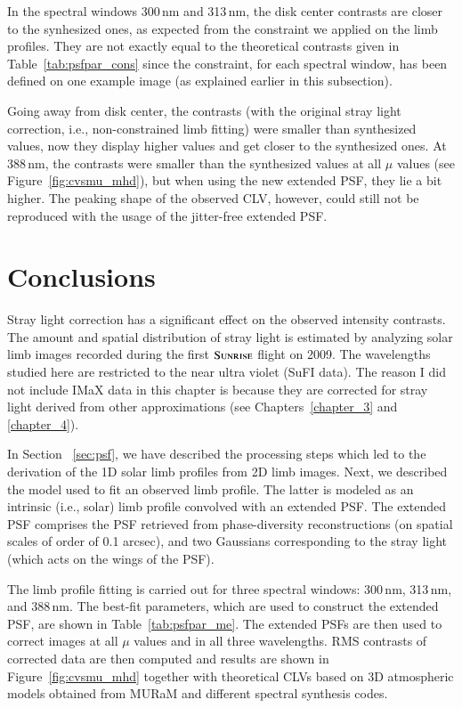\documentclass[goettingen, gauss, print]{thesis}
\begin{document}
In the spectral windows 300\,nm and 313\,nm, the disk center contrasts are closer to the synhesized ones, as expected from the constraint we applied on the limb profiles. They are not exactly equal to the theoretical contrasts given in Table~\ref{tab:psfpar_cons} since the constraint, for each spectral window, has been defined on one example image (as explained earlier in this subsection). 

Going away from disk center, the contrasts (with the original stray light correction, i.e., non-constrained limb fitting) were smaller than synthesized values, now they display higher values and get closer to the synthesized ones. At 388\,nm, the contrasts were smaller than the synthesized values at all $\mu$ values (see Figure~\ref{fig:cvsmu_mhd}), but when using the new extended PSF, they lie a bit higher. The peaking shape of the observed CLV, however, could still not be reproduced with the usage of the jitter-free extended PSF.



\section{Conclusions}
\label{conclusions}
Stray light correction has a significant effect on the observed intensity contrasts. The amount and spatial distribution of stray light is estimated by analyzing solar limb images recorded during the first $\textsc{Sunrise}$ flight on 2009. The wavelengths studied here are restricted to the near ultra violet (SuFI data). The reason I did not include IMaX data in this chapter is because they are corrected for stray light derived from other approximations (see Chapters~\ref{chapter_3} and \ref{chapter_4}).

In Section ~\ref{sec:psf}, we have described the processing steps which led to the derivation of the 1D solar limb profiles from 2D limb images. Next, we described the model used to fit an observed limb profile. The latter is modeled as an intrinsic (i.e., solar) limb profile convolved with an extended PSF. The extended PSF comprises the PSF retrieved from phase-diversity reconstructions (on spatial scales of order of 0.1 arcsec), and two Gaussians corresponding to the stray light (which acts on the wings of the PSF). 

The limb profile fitting is carried out for three spectral windows: 300\,nm, 313\,nm, and 388\,nm. The best-fit parameters, which are used to construct the extended PSF, are shown in Table~\ref{tab:psfpar_me}. The extended PSFs are then used to correct images at all $\mu$ values and in all three wavelengths. RMS contrasts of corrected data are then computed and results are shown in Figure~\ref{fig:cvsmu_mhd} together with theoretical CLVs based on 3D atmospheric models obtained from MURaM and different spectral synthesis codes.
\end{document}
